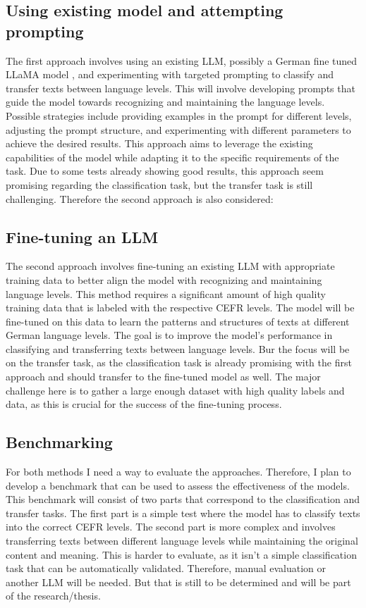 \documentclass{article}
\begin{document}
\subsection{Using existing model and attempting prompting}
The first approach involves using an existing LLM, possibly a German fine tuned LLaMA model \cite{llama_german_finetune}, and 
experimenting with targeted prompting to classify and transfer texts between language levels.
This will involve developing prompts that guide the model towards recognizing and maintaining the
language levels. Possible strategies include providing examples in the prompt for different levels,
adjusting the prompt structure, and experimenting with different parameters to achieve the desired
results. This approach aims to leverage the existing capabilities of the model while adapting it to
the specific requirements of the task. Due to some tests already showing good results, this approach
seem promising regarding the classification task, but the transfer task is still challenging.
Therefore the second approach is also considered:

\subsection{Fine-tuning an LLM}
The second approach involves fine-tuning an existing LLM with appropriate training data to better
align the model with recognizing and maintaining language levels. This method requires a significant
amount of high quality training data that is labeled with the respective CEFR levels. The model will
be fine-tuned on this data to learn the patterns and structures of texts at different German language
levels. The goal is to improve the model's performance in classifying and transferring texts between
language levels. Bur the focus will be on the transfer task, as the classification task is already
promising with the first approach and should transfer to the fine-tuned model as well. The major
challenge here is to gather a large enough dataset with high quality labels and data, as this is
crucial for the success of the fine-tuning process.

\subsection{Benchmarking}
For both methods I need a way to evaluate the approaches. Therefore, I plan to develop a benchmark
that can be used to assess the effectiveness of the models. This benchmark will consist of two parts
that correspond to the classification and transfer tasks. The first part is a simple test where the
model has to classify texts into the correct CEFR levels. The second part is more complex and 
involves transferring texts between different language levels while maintaining the original content
and meaning. This is harder to evaluate, as it isn't a simple classification task that can be
automatically validated. Therefore, manual evaluation or another LLM will be needed. But that is 
still to be determined and will be part of the research/thesis.
\end{document}

